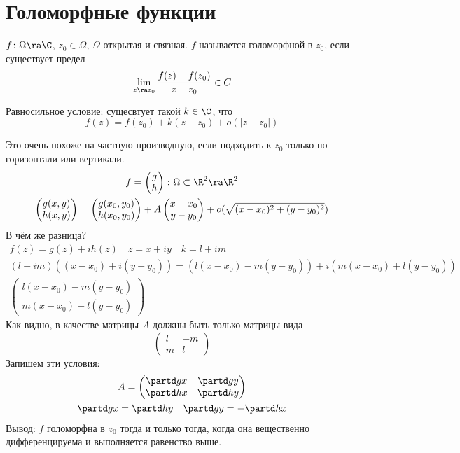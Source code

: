 \section{Голоморфные функции}

\begin{Def}
	$f\colon \Omega \ra \C$, $z_0 \in \Omega$, $\Omega$ открытая и связная.
	$f$ называется голоморфной в $z_0$, если существует предел
	\[ \lim_{z \ra z_0} \frac{f(z) - f(z_0)}{z - z_0} \in C \]
\end{Def}

\begin{Rem}
	Равносильное условие: сущесвтует такой $k \in \C$, что
	\[ f(z) = f(z_0) + k(z - z_0) + o(|z - z_0|) \]
\end{Rem}

\begin{Rem}
	Это очень похоже на частную производную, если подходить к $z_0$ только по горизонтали или вертикали.
	\begin{gather*}
		f = \begin{pmatrix} g \\ h \end{pmatrix}\colon \Omega \subset \R^2 \ra \R^2 \\
		\begin{pmatrix} g(x, y) \\ h(x, y) \end{pmatrix}
		= \begin{pmatrix} g(x_0, y_0) \\ h(x_0, y_0) \end{pmatrix}
		+ A \begin{pmatrix} x - x_0 \\ y - y_0 \end{pmatrix}
		+ o(\sqrt{(x - x_0)^2 + (y - y_0)^2})
	\end{gather*}
	В чём же разница?
	\begin{gather*}
		f(z) = g(z) + ih(z) \quad z = x + iy \quad k = l + im \\
		(l + im)((x - x_0) + i(y - y_0))
		= (l(x - x_0) - m(y - y_0)) + i(m(x - x_0) + l(y - y_0)) \\
		\begin{pmatrix}
			l(x - x_0) - m(y - y_0) \\
			m(x - x_0) + l(y - y_0)
		\end{pmatrix}
	\end{gather*}
	Как видно, в качестве матрицы $A$ должны быть только матрицы вида
	\[\begin{pmatrix}
		l & -m \\
		m & l
	\end{pmatrix}\]
	Запишем эти условия:
	\begin{gather*}
		A = \begin{pmatrix}
			\partd gx & \partd gy \\
			\partd hx & \partd hy
		\end{pmatrix} \\
		\partd gx = \partd hy \quad \partd gy = -\partd hx
	\end{gather*}
	Вывод: $f$ голоморфна в $z_0$ тогда и только тогда, когда она вещественно дифференцируема и выполняется равенство выше.
\end{Rem}

